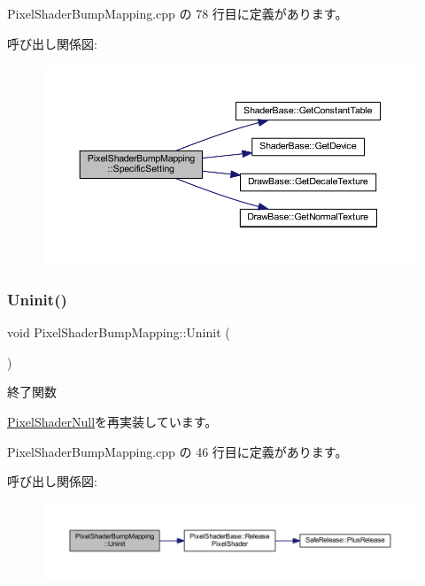  Pixel\+Shader\+Bump\+Mapping.\+cpp の 78 行目に定義があります。

呼び出し関係図\+:\nopagebreak
\begin{figure}[H]
\begin{center}
\leavevmode
\includegraphics[width=350pt]{class_pixel_shader_bump_mapping_afa80c2404b490a444d54cc47c681ca8f_cgraph}
\end{center}
\end{figure}
\mbox{\label{class_pixel_shader_bump_mapping_a004f731db6dab6b59949baed4a5a32d7}} 
\subsubsection{\texorpdfstring{Uninit()}{Uninit()}}
{\footnotesize\ttfamily void Pixel\+Shader\+Bump\+Mapping\+::\+Uninit (\begin{DoxyParamCaption}{ }\end{DoxyParamCaption})\hspace{0.3cm}{\ttfamily [virtual]}}



終了関数 



\mbox{\hyperlink{class_pixel_shader_null_ae5ee2fa95e5da787918ccbd1877cd0ef}{Pixel\+Shader\+Null}}を再実装しています。



 Pixel\+Shader\+Bump\+Mapping.\+cpp の 46 行目に定義があります。

呼び出し関係図\+:\nopagebreak
\begin{figure}[H]
\begin{center}
\leavevmode
\includegraphics[width=350pt]{class_pixel_shader_bump_mapping_a004f731db6dab6b59949baed4a5a32d7_cgraph}
\end{center}
\end{figure}


